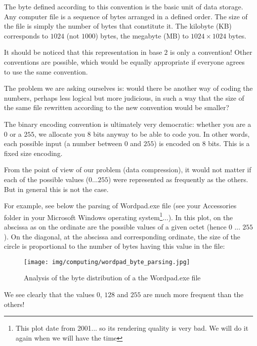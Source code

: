 	The byte defined according to this convention is the basic unit of data storage. Any computer file is a sequence of bytes arranged in a defined order. The size of the file is simply the number of bytes that constitute it. The kilobyte (KB) corresponds to $1024$ (not $1000$) bytes, the megabyte (MB) to $1024\times 1024$ bytes.

	It should be noticed that this representation in base $2$ is only a convention! Other conventions are possible, which would be equally appropriate if everyone agrees to use the same convention.

	The problem we are asking ourselves is: would there be another way of coding the numbers, perhaps less logical but more judicious, in such a way that the size of the same file rewritten according to the new convention would be smaller?

	The binary encoding convention is ultimately very democratic: whether you are a $0$ or a $255$, we allocate you $8$ bits anyway to be able to code you. In other words, each possible input (a number between $0$ and $255$) is encoded on $8$ bits. This is a fixed size encoding.

	From the point of view of our problem (data compression), it would not matter if each of the possible values ($0$...$255$) were represented as frequently as the others. But in general this is not the case.

	For example, see below the parsing of Wordpad.exe file (see your Accessories folder in your Microsoft Windows operating system\footnote{This plot date from 2001... so its rendering quality is very bad. We will do it again when we will have the time}...). In this plot, on the abscissa as on the ordinate are the possible values of a given octet (hence $0$ ... $255$). On the diagonal, at the abscissa and corresponding ordinate, the size of the circle is proportional to the number of bytes having this value in the file:
	\begin{figure}[H]
		\centering
		\texttt{[image: img/computing/wordpad\_byte\_parsing.jpg]}
		\caption[]{Analysis of the byte distribution of a the Wordpad.exe file}
	\end{figure}
	We see clearly that the values $0$, $128$ and $255$ are much more frequent than the others!

